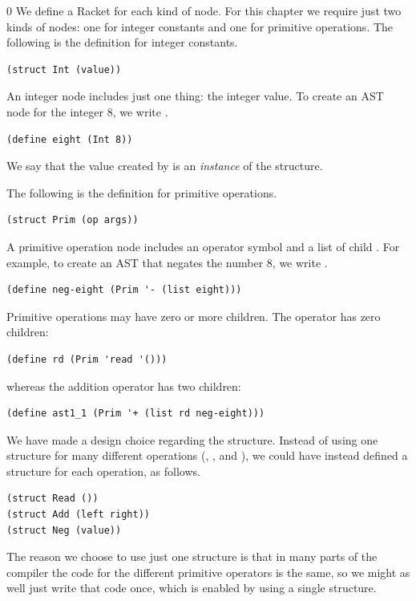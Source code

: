 \documentclass[7x10]{TimesAPriori_MIT}%
\def\racketEd{0}
\def\edition{1}
\begin{document}
{\if\edition\racketEd
We define a Racket  for each kind of node.  For this
chapter we require just two kinds of nodes: one for integer constants
and one for primitive operations.  The following is the 
definition for integer constants.
\begin{lstlisting}
(struct Int (value))
\end{lstlisting}
An integer node includes just one thing: the integer value.
To create an AST node for the integer $8$, we write .
\begin{lstlisting}
(define eight (Int 8))
\end{lstlisting}
We say that the value created by  is an
\emph{instance} of the
 structure.

The following is the  definition for primitive operations.
\begin{lstlisting}
(struct Prim (op args))
\end{lstlisting}
A primitive operation node includes an operator symbol  and a
list of child . For example, to create an AST that negates
the number $8$, we write .
\begin{lstlisting}
(define neg-eight (Prim '- (list eight)))
\end{lstlisting}
Primitive operations may have zero or more children. The 
operator has zero children:
\begin{lstlisting}
(define rd (Prim 'read '()))
\end{lstlisting}
whereas the addition operator has two children:
\begin{lstlisting}
(define ast1_1 (Prim '+ (list rd neg-eight)))
\end{lstlisting}

We have made a design choice regarding the  structure.
Instead of using one structure for many different operations
(, \code{+}, and \code{-}), we could have instead defined a
structure for each operation, as follows.
\begin{lstlisting}
(struct Read ())
(struct Add (left right))
(struct Neg (value))
\end{lstlisting}
The reason we choose to use just one structure is that in many parts
of the compiler the code for the different primitive operators is the
same, so we might as well just write that code once, which is enabled
by using a single structure.
\fi}
\end{document}
